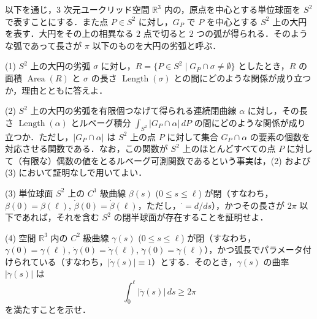 \documentclass[12pt]{jlreq}
\newcommand{\R}{\mathbb{R}}
\newcommand{\dd}{\,d}
\begin{document}
以下を通じ，\(3\) 次元ユークリッド空間 \(\R^3\) 内の，原点を中心とする単位球面を \(S^2\) で表すことにする．また点 \(P \in S^2\) に対し，\(G_P\) で \(P\) を中心とする \(S^2\) 上の大円を表す．大円をその上の相異なる \(2\) 点で切ると \(2\) つの弧が得られる．そのような弧であって長さが \(\pi\) 以下のものを大円の劣弧と呼ぶ．

(1) \(S^2\) 上の大円の劣弧 \(\sigma\) に対し，\(R = \{ P \in S^2 \mid G_P \cap \sigma \ne \emptyset \}\) としたとき，\(R\) の面積 \(\operatorname{Area}(R)\) と \(\sigma\) の長さ \(\operatorname{Length}(\sigma)\) との間にどのような関係が成り立つか，理由とともに答えよ．

(2) \(S^2\) 上の大円の劣弧を有限個つなげて得られる連続閉曲線 \(\alpha\) に対し，その長さ \(\operatorname{Length}(\alpha)\) とルベーグ積分 \(\int_{S^2} |G_P \cap \alpha| \dd P\) の間にどのような関係が成り立つか．ただし，\(|G_P \cap \alpha|\) は \(S^2\) 上の点 \(P\) に対して集合 \(G_P \cap \alpha\) の要素の個数を対応させる関数である．なお，この関数が \(S^2\) 上のほとんどすべての点 \(P\) に対して（有限な）偶数の値をとるルベーグ可測関数であるという事実は，(2) および (3) において証明なしで用いてよい．

(3) 単位球面 \(S^2\) 上の \(C^1\) 級曲線 \(\beta(s)\) (\(0 \le s \le \ell\)) が閉（すなわち，\(\beta(0) = \beta(\ell)\), \(\dot{\beta}(0) = \dot{\beta}(\ell)\)，ただし，\({}^\cdot = d/ds\)），かつその長さが \(2\pi\) 以下であれば，それを含む \(S^2\) の閉半球面が存在することを証明せよ．

(4) 空間 \(\R^3\) 内の \(C^2\) 級曲線 \(\gamma(s)\) (\(0 \le s \le \ell\)) が閉（すなわち，\(\gamma(0) = \gamma(\ell)\), \(\dot{\gamma}(0) = \dot{\gamma}(\ell)\), \(\ddot{\gamma}(0) = \ddot{\gamma}(\ell)\)），かつ弧長でパラメータ付けられている（すなわち，\(|\dot{\gamma}(s)| \equiv 1\)）とする．そのとき，\(\gamma(s)\) の曲率 \(|\ddot{\gamma}(s)|\) は
  \[
    \int_0^\ell |\ddot{\gamma}(s)| \dd s \ge 2\pi
  \]
  を満たすことを示せ．
\end{document}
